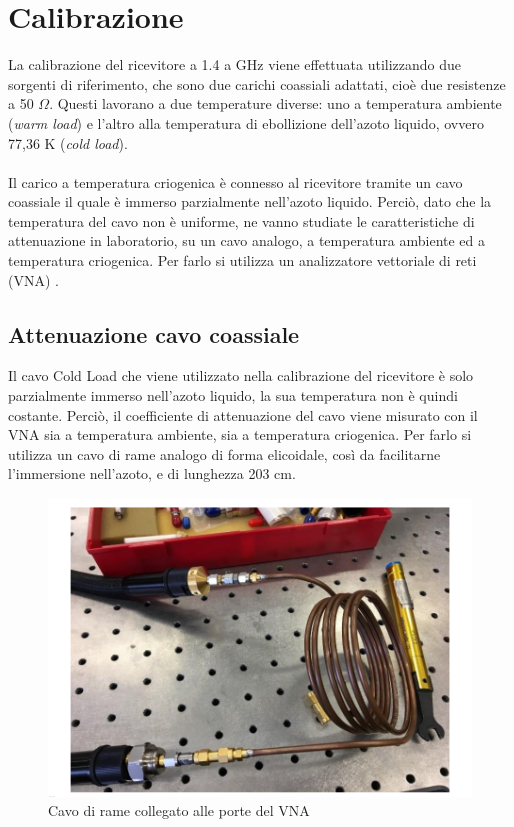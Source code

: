 \section{Calibrazione}
La calibrazione del ricevitore a 1.4 a GHz viene effettuata utilizzando due sorgenti di riferimento, che sono due carichi coassiali adattati, cioè due resistenze a 50 $\Omega$. Questi lavorano a due temperature diverse: uno a temperatura ambiente (\textit{warm load}) e l'altro alla temperatura di ebollizione dell'azoto liquido, ovvero 77,36 K (\textit{cold load}). 
\\\\Il carico a temperatura criogenica è connesso al ricevitore tramite un cavo coassiale il quale è immerso parzialmente nell'azoto liquido. Perciò, dato che la temperatura del cavo non è uniforme, ne vanno studiate le caratteristiche di attenuazione in laboratorio, su un cavo analogo, a temperatura ambiente ed a temperatura criogenica. Per farlo si utilizza un analizzatore vettoriale di reti (VNA) \cite{Calibrazione-ricevitori}.

\subsection{Attenuazione cavo coassiale}
Il cavo Cold Load che viene utilizzato nella calibrazione del ricevitore è solo parzialmente immerso nell'azoto liquido, la sua temperatura non è quindi costante. Perciò, il coefficiente di attenuazione del cavo viene misurato con il VNA sia a temperatura ambiente, sia a temperatura criogenica. Per farlo si utilizza un cavo di rame analogo di forma elicoidale, così da facilitarne l'immersione nell'azoto, e di lunghezza 203 cm. 

\begin{figure}[h]
\includegraphics[scale=0.60]{cavo rame.png}
\centering
\caption{Cavo di rame collegato alle porte del VNA}
\label{fig:Cavo di rame}
\end{figure}

